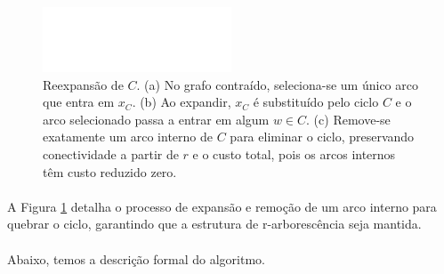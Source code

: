 \documentclass[12pt,a4paper]{article}
\begin{document}
\begin{figure}[H]
    \centering
    \includegraphics[width=0.9\linewidth]{figures/fig_chu_liu_reexpansion.pdf}

    \caption{Reexpansão de $C$. (a) No grafo contraído, seleciona-se um único arco que entra em $x_C$. (b) Ao expandir, $x_C$ é substituído pelo ciclo $C$ e o arco selecionado passa a entrar em algum $w\in C$. (c) Remove-se exatamente um arco interno de $C$ para eliminar o ciclo, preservando conectividade a partir de $r$ e o custo total, pois os arcos internos têm custo reduzido zero.}
    \label{fig:chu-liu-reexpansion}\end{figure}


\paragraph{}
A Figura \ref{fig:chu-liu-reexpansion} detalha o processo de expansão e remoção de um arco interno para quebrar o ciclo, garantindo que a estrutura de r-arborescência seja mantida.

\paragraph{}
Abaixo, temos a descrição formal do algoritmo.
\end{document}

